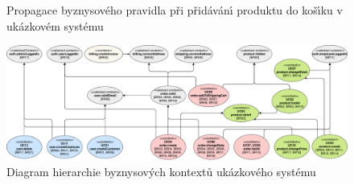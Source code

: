 \begin{figure}
    \centering
    \caption{Propagace byznysového pravidla při přidáván\'{\i} produktu do koš\'{\i}ku v ukázkovém systému}
    \label{fig:example-screenshot}
\end{figure}


\begin{figure}
    \centering
    \includegraphics[keepaspectratio=true, width=\linewidth]{figures/example-system-context-hierarchy.pdf}
    \caption{Diagram hierarchie byznysov\'ych kontextů ukázkového systému}
    \label{fig:example-system-context-hirearchy}
\end{figure}